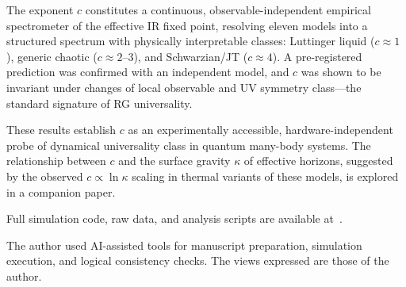 \documentclass[aps,prl,twocolumn,showpacs,preprintnumbers,superscriptaddress]{revtex4-2}
\begin{document}
The exponent $c$ constitutes a continuous, observable-independent
empirical spectrometer of the effective IR fixed point, resolving
eleven models into a structured spectrum with physically interpretable
classes: Luttinger liquid ($c \approx 1$), generic chaotic
($c \approx 2$--$3$), and Schwarzian/JT ($c \approx 4$).
A pre-registered prediction was confirmed with an independent model,
and $c$ was shown to be invariant under changes of local observable and
UV symmetry class---the standard signature of RG universality.

These results establish $c$ as an experimentally accessible, hardware-independent
probe of dynamical universality class in quantum many-body systems.
The relationship between $c$ and the surface gravity $\kappa$ of effective
horizons, suggested by the observed $c \propto \ln\kappa$ scaling in
thermal variants of these models, is explored in a companion paper.

Full simulation code, raw data, and analysis scripts are available
at~\cite{PerezEugenio2026b}.

\begin{acknowledgments}
The author used AI-assisted tools for manuscript preparation, simulation
execution, and logical consistency checks.
The views expressed are those of the author.
\end{acknowledgments}



\end{document}
